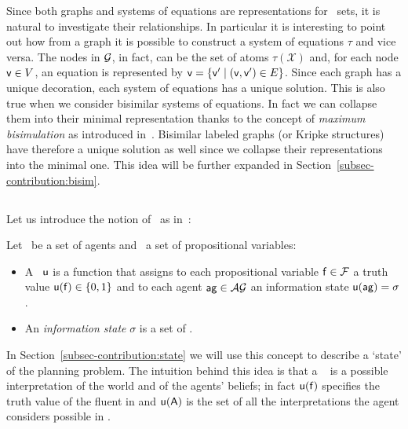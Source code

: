 	Since both  graphs and systems of equations are representations for \nwf\ sets, it is natural to investigate their relationships.
	In particular it is interesting to point out how from a graph  it is possible to construct a system of equations $\tau$ and vice versa.
	The nodes in $\mathcal{G}$, in fact, can be the set of atoms $\tau(\mathcal{X})$ and, for each node $\mathsf{v} \in V$, an equation  is represented by $ \mathsf{v} = \{\mathsf{v}^\prime \mid (\mathsf{v}, \mathsf{v}^\prime) \in E\}$.
	Since each graph has a unique decoration, each system of equations has a unique solution.
	This is also true when we consider bisimilar systems of equations. In fact we can collapse them into their minimal representation thanks to the concept of \emph{maximum bisimulation} as introduced in~\cite{DBLP:conf/iclp/Dovier15}.
	Bisimilar labeled graphs (or Kripke structures) have therefore a unique solution as well since we collapse their representations into the minimal one. This idea will be further expanded in Section~\ref{subsec-contribution:bisim}.
	

	
	\subsection{\PosS}\label{subsec-possibilities:possibilities}
	Let us introduce the notion of \pos\, as in~\cite{Gerbrandy1997}:
	\begin{definition}[\posS]\label{def:pos}
		Let \sAG\ be a set of agents and \sP\ a set of propositional variables:%
		\begin{itemize}
			\item A \emph{\pos}\ $\mathsf{u}$ is a function that assigns to each propositional variable $\mathsf{f} \in \mathcal{F}$ a truth value $\mathsf{u}(\mathsf{f}) \in \{0,1\}$ and to each agent $\agent{ag} \in \sAG$ an information state $\possarg{u}{\agent{ag}} = \sigma$.
			\item An \emph{information state} $\sigma$ is a set of \posS.
		\end{itemize}
	\end{definition}
	
	In Section~\ref{subsec-contribution:state} we will use this concept to describe a \textquoteleft state' of the planning problem.
	The intuition behind this idea is that a \pos\  is a possible interpretation of the world and of the agents' beliefs; in fact $\mathsf{u}(\mathsf{f})$ specifies the truth value of the fluent  in  and $\possarg{u}{\agent{a}}$ is the set of all the interpretations the agent  considers possible in .
	
